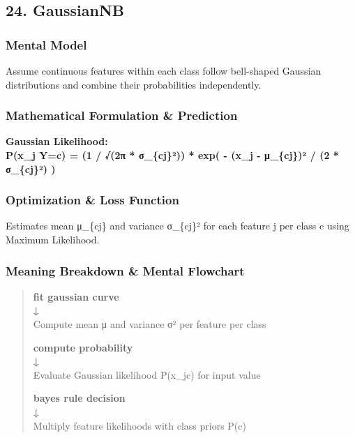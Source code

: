 \documentclass[
  10pt,
  letterpaper,
]{article}
\begin{document}
\hypertarget{gaussiannb}{%
\subsection{24. GaussianNB}\label{gaussiannb}}

\hypertarget{mental-model-23}{%
\subsubsection{Mental Model}\label{mental-model-23}}

Assume continuous features within each class follow bell-shaped Gaussian distributions and combine their probabilities independently.

\hypertarget{mathematical-formulation-prediction-23}{%
\subsubsection{Mathematical Formulation \& Prediction}\label{mathematical-formulation-prediction-23}}

\textbf{Gaussian Likelihood:\\
P(x\_j \textbar{} Y=c) = (1 / √(2π * σ\_\{cj\}²)) * exp( - (x\_j - μ\_\{cj\})² / (2 * σ\_\{cj\}²) )}

\hypertarget{optimization-loss-function-23}{%
\subsubsection{Optimization \& Loss Function}\label{optimization-loss-function-23}}

Estimates mean μ\_\{cj\} and variance σ\_\{cj\}² for each feature j per class c using Maximum Likelihood.

\hypertarget{meaning-breakdown-mental-flowchart-23}{%
\subsubsection{Meaning Breakdown \& Mental Flowchart}\label{meaning-breakdown-mental-flowchart-23}}

\begin{quote}
\textbf{fit gaussian curve\\
↓\\
}Compute mean μ and variance σ² per feature per class

\textbf{compute probability\\
↓\\
}Evaluate Gaussian likelihood P(x\_j\textbar c) for input value

\textbf{bayes rule decision\\
↓\\
}Multiply feature likelihoods with class priors P(c)
\end{quote}
\end{document}
